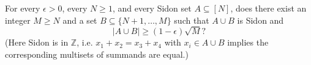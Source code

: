 For every $\epsilon>0$, every $N\ge 1$, and every Sidon set $A\subseteq [N]$, does there exist an integer $M\ge N$ and a set $B\subseteq \{N+1,\dots,M\}$ such that $A\cup B$ is Sidon and
\[
|A\cup B|\ge (1-\epsilon)\sqrt{M}?
\]
(Here Sidon is in $\mathbb{Z}$, i.e. $x_1+x_2=x_3+x_4$ with $x_i\in A\cup B$ implies the corresponding multisets of summands are equal.)
